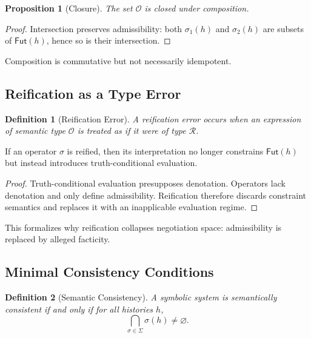 \documentclass[11pt]{article}
\newtheorem{definition}{Definition}
\newtheorem{proposition}{Proposition}
\begin{document}
\begin{proposition}[Closure]
The set $\mathcal{O}$ is closed under composition.
\end{proposition}

\begin{proof}
Intersection preserves admissibility: both $\sigma_1(h)$ and $\sigma_2(h)$ are
subsets of $\mathsf{Fut}(h)$, hence so is their intersection.
\end{proof}

Composition is commutative but not necessarily idempotent.

\subsection{Reification as a Type Error}

\begin{definition}[Reification Error]
A reification error occurs when an expression of semantic type $\mathcal{O}$ is
treated as if it were of type $\mathcal{R}$.
\end{definition}

\begin{lemma}
If an operator $\sigma$ is reified, then its interpretation no longer constrains
$\mathsf{Fut}(h)$ but instead introduces truth-conditional evaluation.
\end{lemma}

\begin{proof}
Truth-conditional evaluation presupposes denotation. Operators lack denotation and
only define admissibility. Reification therefore discards constraint semantics and
replaces it with an inapplicable evaluation regime.
\end{proof}

This formalizes why reification collapses negotiation space: admissibility is
replaced by alleged facticity.

\subsection{Minimal Consistency Conditions}

\begin{definition}[Semantic Consistency]
A symbolic system is semantically consistent if and only if for all histories
$h$,
\[
\bigcap_{\sigma \in \Sigma} \sigma(h) \neq \varnothing.
\]
\end{definition}
\end{document}
